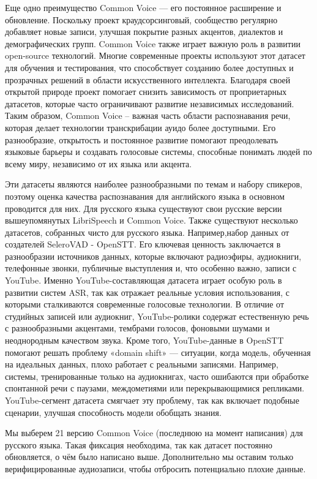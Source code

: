 Еще одно преимущество Common Voice — его постоянное расширение и обновление. Поскольку проект краудсорсинговый, сообщество регулярно добавляет новые записи, улучшая покрытие разных акцентов, диалектов и демографических групп.
Common Voice также играет важную роль в развитии open-source технологий.
Многие современные проекты используют этот датасет для обучения и тестирования, что способствует созданию более доступных и прозрачных решений в области искусственного интеллекта.
Благодаря своей открытой природе проект помогает снизить зависимость от проприетарных датасетов, которые часто ограничивают развитие независимых исследований.
Таким образом, Common Voice -- важная часть области распознавания речи, которая делает технологии транскрибации ауидо более доступными.
Его разнообразие, открытость и постоянное развитие помогают преодолевать языковые барьеры и создавать голосовые системы, способные понимать людей по всему миру, независимо от их языка или акцента.

Эти датасеты являются наиболее разнообразными по темам и набору спикеров, поэтому оценка качества распознавания для английского языка в основном проводится для них.
Для русского языка существуют свои русские версии вышеупомянутых LibriSpeech и Common Voice.
Также существуют несколько датасетов, собранных чисто для русского языка. 
Например,набор данных от создателей SeleroVAD - OpenSTT. 
Его ключевая ценность заключается в разнообразии источников данных, которые включают радиоэфиры, аудиокниги, телефонные звонки, публичные выступления и, что особенно важно, записи с YouTube.
Именно YouTube-составляющая датасета играет особую роль в развитии систем ASR, так как отражает реальные условия использования, с которыми сталкиваются современные голосовые технологии.
В отличие от студийных записей или аудиокниг, YouTube-ролики содержат естественную речь с разнообразными акцентами, тембрами голосов, фоновыми шумами и неоднородным качеством звука. 
Кроме того, YouTube-данные в OpenSTT помогают решать проблему «domain shift» — ситуации, когда модель, обученная на идеальных данных, плохо работает с реальными записями.
Например, системы, тренированные только на аудиокнигах, часто ошибаются при обработке спонтанной речи с паузами, междометиями или перекрывающимися репликами.
YouTube-сегмент датасета смягчает эту проблему, так как включает подобные сценарии, улучшая способность модели обобщать знания.

Мы выберем 21 версию Common Voice (последнюю на момент написания) для русского языка.
Такая фиксация необходима, так как датасет постоянно обновляется, о чём было написано выше.
Дополнительно мы оставим только верифицированные аудиозаписи, чтобы отбросить потенциально плохие данные.

